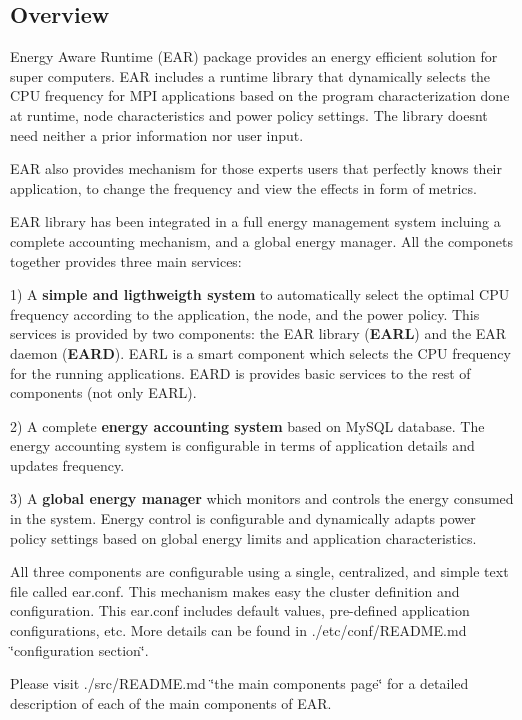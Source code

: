 \subsection*{Overview }

 Energy Aware Runtime (E\+AR) package provides an energy efficient solution for super computers. E\+AR includes a runtime library that dynamically selects the C\+PU frequency for M\+PI applications based on the program characterization done at runtime, node characteristics and power policy settings. The library doesn\textquotesingle{}t need neither a prior information nor user input.

E\+AR also provides mechanism for those experts users that perfectly knows their application, to change the frequency and view the effects in form of metrics.

E\+AR library has been integrated in a full energy management system incluing a complete accounting mechanism, and a global energy manager. All the componets together provides three main services\+:

1) A {\bfseries simple and ligthweigth system} to automatically select the optimal C\+PU frequency according to the application, the node, and the power policy. This services is provided by two components\+: the E\+AR library ({\bfseries E\+A\+RL}) and the E\+AR daemon ({\bfseries E\+A\+RD}). E\+A\+RL is a smart component which selects the C\+PU frequency for the running applications. E\+A\+RD is provides basic services to the rest of components (not only E\+A\+RL).

2) A complete {\bfseries energy accounting system} based on My\+S\+QL database. The energy accounting system is configurable in terms of application details and updates frequency.

3) A {\bfseries global energy manager} which monitors and controls the energy consumed in the system. Energy control is configurable and dynamically adapts power policy settings based on global energy limits and application characteristics.

All three components are configurable using a single, centralized, and simple text file called \textquotesingle{}ear.\+conf\textquotesingle{}. This mechanism makes easy the cluster definition and configuration. This \textquotesingle{}ear.\+conf\textquotesingle{} includes default values, pre-\/defined application configurations, etc. More details can be found in ./etc/conf/\+R\+E\+A\+D\+ME.md \char`\"{}configuration section\char`\"{}.

Please visit ./src/\+R\+E\+A\+D\+ME.md \char`\"{}the main components page\char`\"{} for a detailed description of each of the main components of E\+AR.

